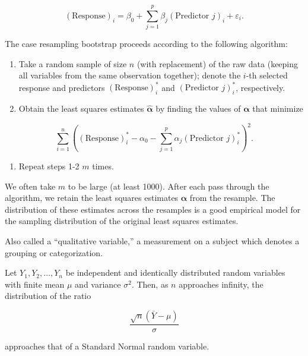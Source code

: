 \documentclass[
  letterpaper,
  DIV=11,
  numbers=noendperiod]{scrreprt}
\providecommand{\tightlist}{%
  \setlength{\itemsep}{0pt}\setlength{\parskip}{0pt}}\usepackage{longtable,booktabs,array}
\theoremstyle{definition}
\theoremstyle{definition}
\theoremstyle{remark}
\begin{document}
\[(\text{Response})_i = \beta_0 + \sum_{j=1}^{p} \beta_j (\text{Predictor } j)_i + \varepsilon_i.\]

The case resampling bootstrap proceeds according to the following
algorithm:

\begin{enumerate}
\def\labelenumi{\arabic{enumi}.}
\tightlist
\item
  Take a random sample of size \(n\) (with replacement) of the raw data
  (keeping all variables from the same observation together); denote the
  \(i\)-th selected response and predictors \((\text{Response})_i^*\)
  and \((\text{Predictor } j)_i^*\), respectively.
\item
  Obtain the least squares estimates \(\widehat{\boldsymbol{\alpha}}\)
  by finding the values of \(\boldsymbol{\alpha}\) that minimize
\end{enumerate}

\[\sum_{i=1}^{n} \left((\text{Response})_i^* - \alpha_0 - \sum_{j=1}^{p} \alpha_j (\text{Predictor } j)_i^*\right)^2.\]

\begin{enumerate}
\def\labelenumi{\arabic{enumi}.}
\setcounter{enumi}{2}
\tightlist
\item
  Repeat steps 1-2 \(m\) times.
\end{enumerate}

We often take \(m\) to be large (at least 1000). After each pass through
the algorithm, we retain the least squares estimates
\(\widehat{\boldsymbol{\alpha}}\) from the resample. The distribution of
these estimates across the resamples is a good empirical model for the
sampling distribution of the original least squares estimates.

\begin{description}
\tightlist
\item[Categorical Variable (Definition~\ref{def-categorical-variable})]
Also called a ``qualitative variable,'' a measurement on a subject which
denotes a grouping or categorization.
\item[Central Limit Theorem (Definition~\ref{def-clt})]
Let \(Y_1, Y_2, \dotsc, Y_n\) be independent and identically distributed
random variables with finite mean \(\mu\) and variance \(\sigma^2\).
Then, as \(n\) approaches infinity, the distribution of the ratio
\end{description}

\[\frac{\sqrt{n}\left(\bar{Y} - \mu\right)}{\sigma}\]

approaches that of a Standard Normal random variable.
\end{document}
